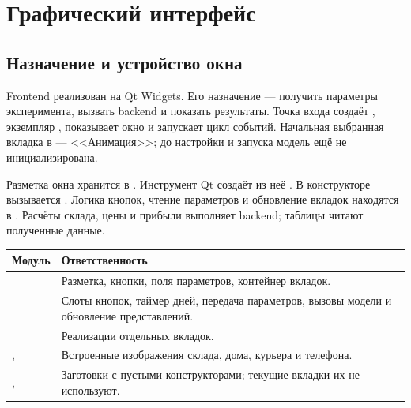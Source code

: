 \section{Графический интерфейс}
\label{sec:frontend}

\subsection{Назначение и устройство окна}
Frontend реализован на Qt Widgets. Его назначение --- получить параметры
эксперимента, вызвать backend и показать результаты. Точка входа
 создаёт , экземпляр ,
показывает окно и запускает цикл событий. Начальная выбранная вкладка в
 --- <<Анимация>>; до настройки и запуска модель ещё
не инициализирована.

Разметка окна хранится в . Инструмент Qt 
создаёт из неё . В конструкторе вызывается
. Логика кнопок, чтение параметров и обновление вкладок
находятся в . Расчёты склада, цены и прибыли выполняет
backend; таблицы читают полученные данные.

\begin{tabularx}{\textwidth}{@{}L{0.38\textwidth}Y@{}}
\toprule
Модуль & Ответственность \\
\midrule
{} & Разметка, кнопки, поля параметров, контейнер вкладок. \\
 & Слоты кнопок, таймер дней, передача параметров,
вызовы модели и обновление представлений. \\
 & Реализации отдельных вкладок. \\
,  & Встроенные изображения склада,
дома, курьера и телефона. \\
, 
& Заготовки с пустыми конструкторами; текущие вкладки их не используют. \\
\bottomrule
\end{tabularx}


